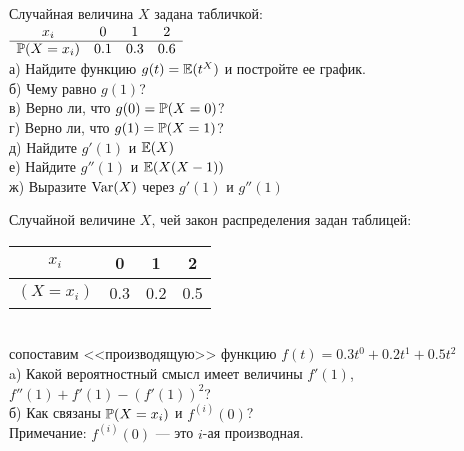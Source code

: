 \begin{solution}
\begin{solution}
\begin{solution}
\begin{solution}
\begin{solution}
\begin{solution}
\begin{solution}
\end{solution}

\begin{problem}
Случайная величина $X$ задана табличкой: \\
$\begin{array}{cccc}
  x_{i} & 0 & 1 & 2 \\
  \hline
  \P(X=x_{i}) & 0.1 & 0.3 & 0.6 \\
\end{array}$ \\
а) Найдите функцию $g(t)=\E(t^{X})$ и постройте ее график. \\
б) Чему равно $g(1)$? \\
в) Верно ли, что $g(0)=\P(X=0)$? \\
г) Верно ли, что $g(1)=\P(X=1)$? \\
д) Найдите $g'(1)$ и $\E(X)$ \\
е) Найдите $g''(1)$ и $\E(X(X-1))$ \\
ж) Выразите $\Var(X)$ через $g'(1)$ и $g''(1)$ 
\end{problem} 
\begin{solution} 

\end{solution}

\begin{problem}
  Случайной величине $X$, чей закон распределения задан таблицей: \\
\begin{tabular}{|c|c|c|c|}
  \hline
  $x_{i}$ & 0 & 1 & 2 \\
  \hline
  $(X=x_{i})$ & 0.3 & 0.2 & 0.5 \\
  \hline
\end{tabular} \\
сопоставим <<производящую>> функцию
$f(t)=0.3t^{0}+0.2t^{1}+0.5t^{2}$ \\
a) Какой вероятностный смысл имеет величины $f'(1)$,
$f''(1)+f'(1)-(f'(1))^{2}$? \\
б) Как связаны $\P(X=x_{i})$ и $f^{(i)}(0)$? \\
Примечание: $f^{(i)}(0)$ --- это $i$-ая производная. 
\end{problem} 
\begin{solution} 

\end{solution}


\end{solution}
\end{solution}
\end{solution}
\end{solution}
\end{solution}
\end{solution}
